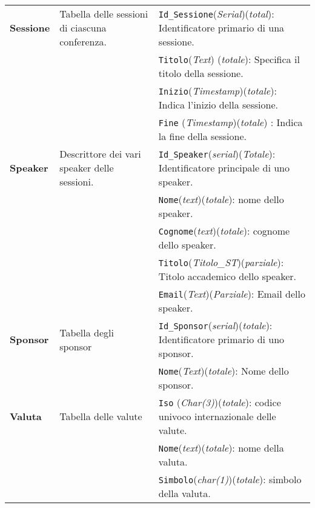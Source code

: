 \begin{longtable}{|p{}|p{}|p{}|}
	\textbf{Sessione} & Tabella delle sessioni di ciascuna conferenza. & \texttt{Id\_Sessione}(\textit{Serial})(\textit{total}): Identificatore primario di una sessione. \\
	& & \texttt{Titolo}(\textit{Text}) (\textit{totale}): Specifica il titolo della sessione. \\
	& & \texttt{Inizio}(\textit{Timestamp})(\textit{totale}): Indica l'inizio della sessione. \\
	& & \texttt{Fine} (\textit{Timestamp})(\textit{totale}) : Indica la fine della sessione. \\	\hline
	
	\textbf{Speaker} & Descrittore dei vari speaker delle sessioni. & \texttt{Id\_Speaker}(\textit{serial})(\textit{Totale}): Identificatore principale di uno speaker. \\
	& & \texttt{Nome}(\textit{text})(\textit{totale}): nome dello speaker. \\
	& & \texttt{Cognome}(\textit{text})(\textit{totale}): cognome dello speaker. \\
	& & \texttt{Titolo}(\textit{Titolo\_ST})(\textit{parziale}): Titolo accademico dello speaker. \\
	& & \texttt{Email}(\textit{Text})(\textit{Parziale}): Email dello speaker. \\	\hline
	
	\textbf{Sponsor} & Tabella degli sponsor & \texttt{Id\_Sponsor}(\textit{serial})(\textit{totale}): Identificatore primario di uno sponsor. \\
	& & \texttt{Nome}(\textit{Text})(\textit{totale}): Nome dello sponsor. \\ \hline
	
	\textbf{Valuta} & Tabella delle valute & \texttt{Iso} (\textit{Char(3)})(\textit{totale}): codice univoco internazionale delle valute. \\
	& & \texttt{Nome}(\textit{text})(\textit{totale}): nome della valuta. \\
	& & \texttt{Simbolo}(\textit{char(1)})(\textit{totale}): simbolo della valuta.\\
\end{longtable}